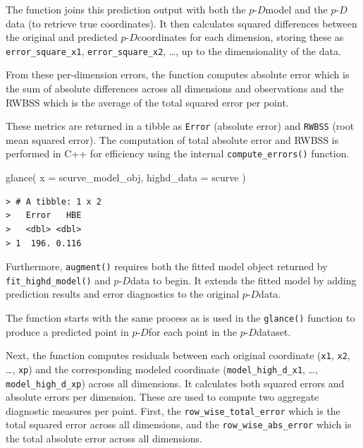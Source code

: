 \documentclass[
  11pt,
  a4paper,
]{report}
\newenvironment{Shaded}{\begin{snugshade}}{\end{snugshade}}
\newcommand{\AttributeTok}[1]{\textcolor[rgb]{0.40,0.45,0.13}{#1}}
\newcommand{\FunctionTok}[1]{\textcolor[rgb]{0.28,0.35,0.67}{#1}}
\newcommand{\NormalTok}[1]{\textcolor[rgb]{0.00,0.23,0.31}{#1}}
\newcommand\pD{$p\text{-}D$}
\begin{document}
The function joins this prediction output with both the \pD model and
the \pD data (to retrieve true coordinates). It then calculates squared
differences between the original and predicted \pD coordinates for each
dimension, storing these as \texttt{error\_square\_x1},
\texttt{error\_square\_x2}, \ldots, up to the dimensionality of the
data.

From these per-dimension errors, the function computes absolute error
which is the sum of absolute differences across all dimensions and
observations and the RWBSS which is the average of the total squared
error per point.

These metrics are returned in a tibble as \texttt{Error} (absolute
error) and \texttt{RWBSS} (root mean squared error). The computation of
total absolute error and RWBSS is performed in C++ for efficiency using
the internal \texttt{compute\_errors()} function.

\begin{Shaded}
\begin{Highlighting}[]
\FunctionTok{glance}\NormalTok{(}
  \AttributeTok{x =}\NormalTok{ scurve\_model\_obj,}
  \AttributeTok{highd\_data =}\NormalTok{ scurve}
\NormalTok{  )}
\end{Highlighting}
\end{Shaded}

\begin{verbatim}
> # A tibble: 1 x 2
>   Error   HBE
>   <dbl> <dbl>
> 1  196. 0.116
\end{verbatim}

Furthermore, \texttt{augment()} requires both the fitted model object
returned by \texttt{fit\_highd\_model()} and \pD data to begin. It
extends the fitted model by adding prediction results and error
diagnostics to the original \pD data.

The function starts with the same process as is used in the
\texttt{glance()} function to produce a predicted point in \pD for each
point in the \pD dataset.

Next, the function computes residuals between each original coordinate
(\texttt{x1}, \texttt{x2}, \ldots, \texttt{xp}) and the corresponding
modeled coordinate (\texttt{model\_high\_d\_x1}, \ldots,
\texttt{model\_high\_d\_xp}) across all dimensions. It calculates both
squared errors and absolute errors per dimension. These are used to
compute two aggregate diagnostic measures per point. First, the
\texttt{row\_wise\_total\_error} which is the total squared error across
all dimensions, and the \texttt{row\_wise\_abs\_error} which is the
total absolute error across all dimensions.
\end{document}
